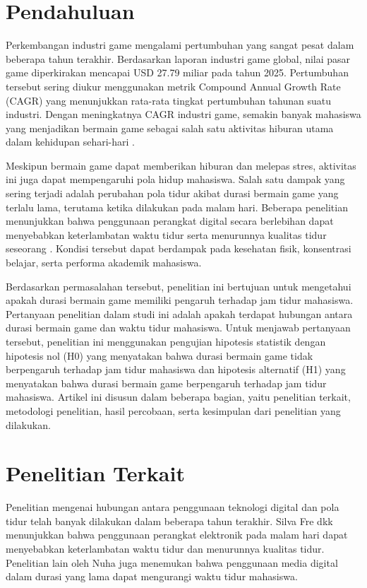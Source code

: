 \documentclass[metlit,article,accept,pdftex,moreauthors]{Definitions/mdpi}
\begin{document}
\section{Pendahuluan}
Perkembangan industri game mengalami pertumbuhan yang sangat pesat dalam beberapa tahun terakhir. Berdasarkan laporan industri game global, nilai pasar game diperkirakan mencapai USD 27.79 miliar pada tahun 2025. Pertumbuhan tersebut sering diukur menggunakan metrik Compound Annual Growth Rate (CAGR) yang menunjukkan rata-rata tingkat pertumbuhan tahunan suatu industri. Dengan meningkatnya CAGR industri game, semakin banyak mahasiswa yang menjadikan bermain game sebagai salah satu aktivitas hiburan utama dalam kehidupan sehari-hari \cite{berita2024}.

Meskipun bermain game dapat memberikan hiburan dan melepas stres, aktivitas ini juga dapat mempengaruhi pola hidup mahasiswa. Salah satu dampak yang sering terjadi adalah perubahan pola tidur akibat durasi bermain game yang terlalu lama, terutama ketika dilakukan pada malam hari. Beberapa penelitian menunjukkan bahwa penggunaan perangkat digital secara berlebihan dapat menyebabkan keterlambatan waktu tidur serta menurunnya kualitas tidur seseorang \cite{Nuha2021,IndustrialWSN2023}. Kondisi tersebut dapat berdampak pada kesehatan fisik, konsentrasi belajar, serta performa akademik mahasiswa.

Berdasarkan permasalahan tersebut, penelitian ini bertujuan untuk mengetahui apakah durasi bermain game memiliki pengaruh terhadap jam tidur mahasiswa. Pertanyaan penelitian dalam studi ini adalah apakah terdapat hubungan antara durasi bermain game dan waktu tidur mahasiswa. Untuk menjawab pertanyaan tersebut, penelitian ini menggunakan pengujian hipotesis statistik dengan hipotesis nol (H0) yang menyatakan bahwa durasi bermain game tidak berpengaruh terhadap jam tidur mahasiswa dan hipotesis alternatif (H1) yang menyatakan bahwa durasi bermain game berpengaruh terhadap jam tidur mahasiswa. Artikel ini disusun dalam beberapa bagian, yaitu penelitian terkait, metodologi penelitian, hasil percobaan, serta kesimpulan dari penelitian yang dilakukan.

\section{Penelitian Terkait}
Penelitian mengenai hubungan antara penggunaan teknologi digital dan pola tidur telah banyak dilakukan dalam beberapa tahun terakhir. Silva Fre dkk \cite{Silva2015} menunjukkan bahwa penggunaan perangkat elektronik pada malam hari dapat menyebabkan keterlambatan waktu tidur dan menurunnya kualitas tidur. Penelitian lain oleh Nuha \cite{Nuha2021} juga menemukan bahwa penggunaan media digital dalam durasi yang lama dapat mengurangi waktu tidur mahasiswa.
\end{document}
